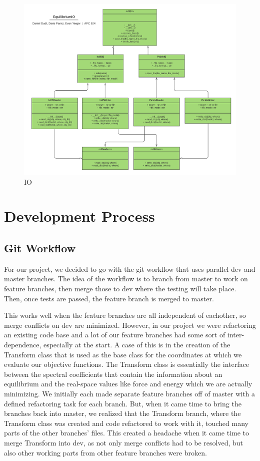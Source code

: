 \documentclass{article}
\begin{document}
%
\begin{figure}[H]
	\centering
	\includegraphics[width=0.8\linewidth,center]{./figs/EquilibriumIO_UML.pdf}
	\caption{IO}
	\label{fig:IO_UML}
\end{figure}

\section{Development Process}

\subsection{Git Workflow}

For our project, we decided to go with the git workflow that uses parallel dev and master branches.
The idea of the workflow is to branch from master to work on feature branches, then merge those to dev where the testing will take place.
Then, once tests are passed, the feature branch is merged to master.

This works well when the feature branches are all independent of eachother, so merge conflicts on dev are minimized.
However, in our project we were refactoring an existing code base and a lot of our feature branches had some sort of inter-dependence, especially at the start.
A case of this is in the creation of the Transform class that is used as the base class for the coordinates at which we evaluate our objective functions.
The Transform class is essentially the interface between the spectral coefficients that contain the information about an equilibrium and the real-space values like force and energy which we are actually minimizing.
We initially each made separate feature branches off of master with a defined refactoring task for each branch.
But, when it came time to bring the branches back into master, we realized that the Transform branch, where the Transform class was created and code refactored to work with it, touched many parts of the other branches' files.
This created a headache when it came time to merge Transform into dev, as not only merge conflicts had to be resolved, but also other working parts from other feature branches were broken.
\end{document}
